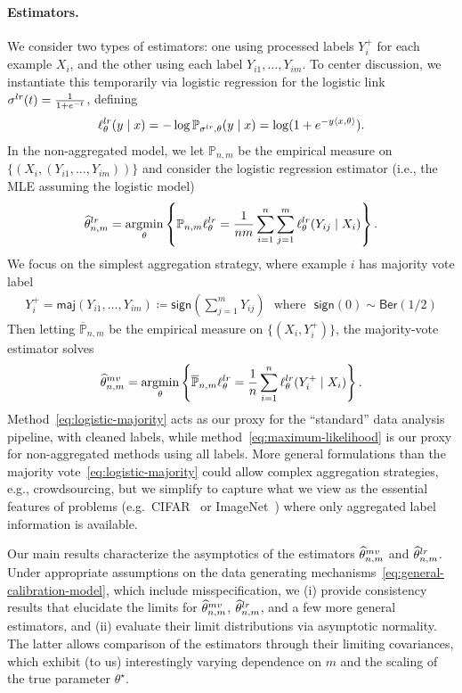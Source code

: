 \documentclass[11pt]{article}
\newcommand{\Prb}{\mathbb{P}}
\newcommand{\brc}[1]{\left\{{#1}\right\}}
\newcommand{\what}[1]{\widehat{#1}}
\newcommand{\wb}[1]{\overline{#1}}
\newcommand{\majY}{Y^+}
\newcommand{\sgn}{\mathsf{sign}}
\newcommand{\maj}{\mathsf{maj}}
\newcommand{\lr}{^{\textup{lr}}}
\newcommand{\mv}{^{\textup{mv}}}
\newcommand{\loss}{\ell}
\newcommand{\<}{\langle} %
\renewcommand{\>}{\rangle}
\DeclareMathOperator*{\argmin}{argmin}
\newcommand{\defeq}{\coloneqq}
\newcommand{\opt}{^\star}
\newcommand{\tmle}{\what{\theta}\lr_{n,m}} %
\newcommand{\mve}{\what{\theta}\mv_{n,m}} %
\begin{document}
\paragraph{Estimators.}
We consider two types of estimators: one
using processed labels $\majY_i$ for each
example $X_i$, and the other
using each label $Y_{i1}, \ldots, Y_{im}$.
%
To center discussion, we instantiate this temporarily via logistic
regression for the logistic link $\sigma\lr(t) = \frac{1}{1 + e^{-t}}$,
defining
\begin{align*}
  \loss_\theta\lr(y \mid x) = -\log \Prb_{\sigma\lr, \theta}(y \mid x)
  = \log(1 + e^{-y\<x,\theta\>})  .
\end{align*}
In the non-aggregated model, we let $\Prb_{n,m}$ be the empirical
measure on $\{(X_i, (Y_{i1},\dots,Y_{im}))\}$ and consider the logistic
regression estimator (i.e., the MLE assuming the logistic model)
\begin{align}
  \label{eq:maximum-likelihood}
  \tmle = \argmin_\theta \left\{\Prb_{n,m} \loss_\theta\lr
  = \frac{1}{nm} \sum_{i = 1}^n \sum_{j = 1}^m \loss_\theta\lr(Y_{ij} \mid X_i)
  \right\}.
\end{align}
We focus on the simplest
aggregation strategy, where example $i$ has majority vote label
\begin{align*}
  \majY_i = \maj(Y_{i1}, \ldots, Y_{im})
  \defeq \sgn\left(\sum_{j=1}^m Y_{ij}\right)
  ~~~\mbox{where}~~~
  \sgn(0) \sim \mathsf{Ber}(1/2)
\end{align*}
Then letting $\wb{\Prb}_{n,m}$ be the empirical measure on
$\{(X_i, \majY_i)\}$, the majority-vote estimator solves
\begin{align}
  \label{eq:logistic-majority}
  \mve = \argmin_\theta  \brc{\wb{\Prb}_{n,m}\loss_\theta\lr = \frac 1 n \sum_{i=1}^n  \loss_\theta\lr(\majY_i \mid X_i)}.
\end{align}
Method~\eqref{eq:logistic-majority} acts as our proxy for the ``standard''
data analysis pipeline, with cleaned labels, while
method~\eqref{eq:maximum-likelihood} is our proxy for non-aggregated methods
using all labels.
%
More general formulations than the majority
vote~\eqref{eq:logistic-majority} could allow complex aggregation
strategies, e.g., crowdsourcing, but we simplify to capture what we view as
the essential features of problems (e.g.\ CIFAR~\cite{KrizhevskyHi09} or
ImageNet~\cite{RussakovskyDeSuKrSaMaHuKaKhBeBeFe15}) where only aggregated
label information is available.

Our main results characterize the
asymptotics of the
estimators $\mve$ and $\tmle$.
%
Under
appropriate assumptions on the data generating
mechanisms~\eqref{eq:general-calibration-model}, which include
misspecification, we (i) provide consistency results that elucidate the
limits for $\mve$, $\tmle$, and a few more general
estimators, and (ii) evaluate their limit distributions via
asymptotic normality. The latter allows comparison
of the estimators through their limiting covariances, which
exhibit (to us) interestingly varying dependence on $m$ and the scaling of
the true parameter $\theta\opt$.
\end{document}
